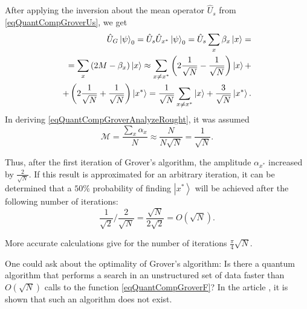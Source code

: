 After applying the inversion about the mean operator $\hat{U}_s$ 
from \eqref{eqQuantCompGroverUs}, we get
\begin{eqnarray}
\hat{U}_G \left|\psi\right>_0 = 
\hat{U}_s \hat{U}_{x^{\ast}} \left|\psi\right>_0 = 
\hat{U}_s \sum_x \beta_x \ket{x} = 
\nonumber \\
= \sum_x \left(2 M - \beta_x\right) \ket{x} \approx 
\sum_{x\ne x^{\ast}} \left( 2 \frac{1}{\sqrt{N}} - \frac{1}{\sqrt{N}}
\right) \ket{x} + 
\nonumber \\
+ \left( 2 \frac{1}{\sqrt{N}} +
\frac{1}{\sqrt{N}} \right) \left|x^{\ast}\right> = 
\frac{1}{\sqrt{N}}\sum_{x\ne x^{\ast}} \ket{x} + 
\frac{3}{\sqrt{N}} \left|x^{\ast}\right>.
\label{eqQuantCompGroverAnalyzeRought}
\end{eqnarray}
In deriving \eqref{eqQuantCompGroverAnalyzeRought}, it was assumed 
\[
\mathcal{M} = \frac{\sum_x \alpha_x}{N} \approx
\frac{N}{N \sqrt{N}} = \frac{1}{\sqrt{N}}.
\]

Thus, after the first iteration of Grover's algorithm, the amplitude
$\alpha_{x^{\ast}}$ increased by $\frac{2}{\sqrt{N}}$. If
this result is approximated for an arbitrary iteration, it can
be determined that a $50\%$ probability of finding $\left|x^{\ast}\right>$
will be achieved after the following number of iterations:
\[
\frac{1}{\sqrt{2}}/\frac{2}{\sqrt{N}} =
\frac{\sqrt{N}}{2 \sqrt{2}} = O\left(\sqrt{N}\right).
\]

More accurate calculations \cite{nielsen2000quantum} give for the number of iterations
$\frac{\pi}{4}\sqrt{N}$. 

One could ask about the optimality of Grover's algorithm: Is there
a quantum algorithm that performs a search in an unstructured
set of data faster than $O\left(\sqrt{N}\right)$ calls to the
function \eqref{eqQuantCompGroverF}? In the article
\cite{bBennettGroverOptimal}, it is shown that such an algorithm
does not exist.